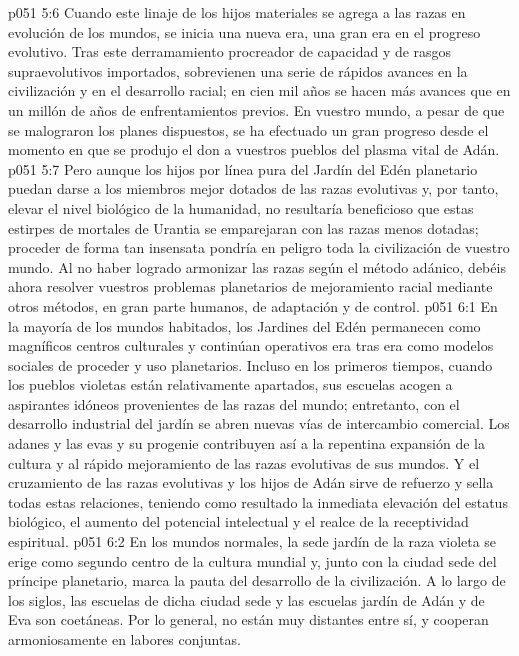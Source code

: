 \vs p051 5:6 Cuando este linaje de los hijos materiales se agrega a las razas en evolución de los mundos, se inicia una nueva era, una gran era en el progreso evolutivo. Tras este derramamiento procreador de capacidad y de rasgos supraevolutivos importados, sobrevienen una serie de rápidos avances en la civilización y en el desarrollo racial; en cien mil años se hacen más avances que en un millón de años de enfrentamientos previos. En vuestro mundo, a pesar de que se malograron los planes dispuestos, se ha efectuado un gran progreso desde el momento en que se produjo el don a vuestros pueblos del plasma vital de Adán.
\vs p051 5:7 Pero aunque los hijos por línea pura del Jardín del Edén planetario puedan darse a los miembros mejor dotados de las razas evolutivas y, por tanto, elevar el nivel biológico de la humanidad, no resultaría beneficioso que estas estirpes de mortales de Urantia se emparejaran con las razas menos dotadas; proceder de forma tan insensata pondría en peligro toda la civilización de vuestro mundo. Al no haber logrado armonizar las razas según el método adánico, debéis ahora resolver vuestros problemas planetarios de mejoramiento racial mediante otros métodos, en gran parte humanos, de adaptación y de control.
\vs p051 6:1 En la mayoría de los mundos habitados, los Jardines del Edén permanecen como magníficos centros culturales y continúan operativos era tras era como modelos sociales de proceder y uso planetarios. Incluso en los primeros tiempos, cuando los pueblos violetas están relativamente apartados, sus escuelas acogen a aspirantes idóneos provenientes de las razas del mundo; entretanto, con el desarrollo industrial del jardín se abren nuevas vías de intercambio comercial. Los adanes y las evas y su progenie contribuyen así a la repentina expansión de la cultura y al rápido mejoramiento de las razas evolutivas de sus mundos. Y el cruzamiento de las razas evolutivas y los hijos de Adán sirve de refuerzo y sella todas estas relaciones, teniendo como resultado la inmediata elevación del estatus biológico, el aumento del potencial intelectual y el realce de la receptividad espiritual.
\vs p051 6:2 En los mundos normales, la sede jardín de la raza violeta se erige como segundo centro de la cultura mundial y, junto con la ciudad sede del príncipe planetario, marca la pauta del desarrollo de la civilización. A lo largo de los siglos, las escuelas de dicha ciudad sede y las escuelas jardín de Adán y de Eva son coetáneas. Por lo general, no están muy distantes entre sí, y cooperan armoniosamente en labores conjuntas.
